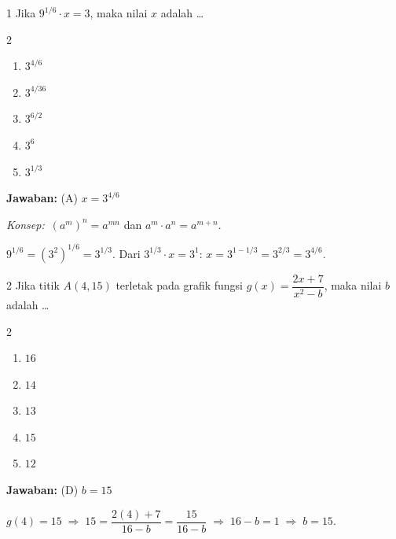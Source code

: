 \documentclass[11pt]{article}
\newcommand{\jawaban}[1]{%
  \noindent\colorbox{gold!30}{\parbox{\dimexpr\linewidth-2\fboxsep\relax}{%
    \textbf{Jawaban:} #1}}\par\smallskip}
\newcommand{\konsep}{\noindent\textit{Konsep:}\ \ignorespaces}
\newenvironment{pilB}{%
  \par\smallskip\begin{multicols}{2}
  \begin{enumerate}[label=(\Alph*),leftmargin=*,itemsep=1pt,topsep=3pt]}%
  {\end{enumerate}\end{multicols}}
\begin{document}
\vspace{0.6cm}
\noindent{}

\clearpage


\begin{soal}{1}
Jika $9^{1/6}\cdot x=3$, maka nilai $x$ adalah \ldots
\begin{pilB}
  \item $3^{4/6}$ \item $3^{4/36}$ \item $3^{6/2}$ \item $3^{6}$ \item $3^{1/3}$
\end{pilB}
\end{soal}
\begin{pembox}
\jawaban{(A) $x=3^{4/6}$}
\konsep $(a^m)^n=a^{mn}$ dan $a^m\cdot a^n=a^{m+n}$.

$9^{1/6}=(3^2)^{1/6}=3^{1/3}$. Dari $3^{1/3}\cdot x=3^1$:
$x=3^{1-1/3}=3^{2/3}=3^{4/6}$.
\end{pembox}

\begin{soal}{2}
Jika titik $A(4,15)$ terletak pada grafik fungsi $g(x)=\dfrac{2x+7}{x^2-b}$,
maka nilai $b$ adalah \ldots
\begin{pilB}
  \item $16$ \item $14$ \item $13$ \item $15$ \item $12$
\end{pilB}
\end{soal}
\begin{pembox}
\jawaban{(D) $b=15$}
$g(4)=15\;\Rightarrow\;15=\dfrac{2(4)+7}{16-b}=\dfrac{15}{16-b}\;\Rightarrow\;16-b=1\;\Rightarrow\;b=15$.
\end{pembox}
\end{document}
